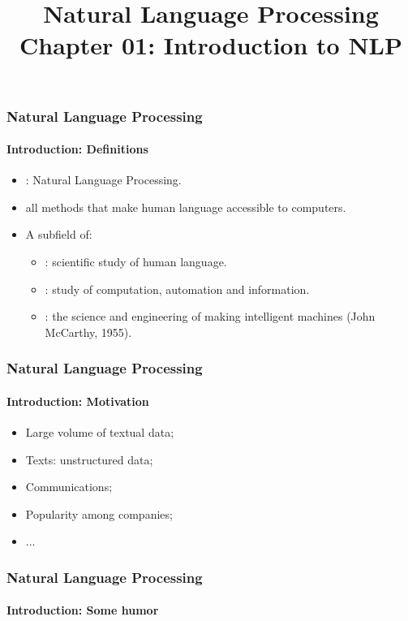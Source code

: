 \documentclass[xcolor=table]{beamer}
\title[NLP: 01- Introduction]%
{Natural Language Processing\\Chapter 01: Introduction to NLP}
\begin{document}
	
\begin{frame}
\frametitle{Natural Language Processing}
\framesubtitle{Introduction: Definitions}

\begin{itemize}
	\item {}: Natural Language Processing.
	\item all methods that make human language accessible to computers.
\end{itemize}
\begin{minipage}{0.78\textwidth}
\begin{itemize}
	\item A subfield of:
	\begin{itemize}
		\item {}: scientific study of human language.
		\item {}: study of computation, automation and information.
		\item {}: the science and engineering of
		making intelligent machines (John McCarthy, 1955).
	\end{itemize}
\end{itemize}
\end{minipage}
\begin{minipage}{0.20\textwidth}
\end{minipage}
\end{frame}

\begin{frame}
\frametitle{Natural Language Processing}
\framesubtitle{Introduction: Motivation}

\begin{itemize}
	\item Large volume of textual data;
	
	\item Texts: unstructured data;
	
	\item Communications;
	
	\item Popularity among companies;
	
	\item ...
\end{itemize}

\end{frame}

\begin{frame}
\frametitle{Natural Language Processing}
\framesubtitle{Introduction: Some humor}

\begin{center}
\end{center}

\end{frame}
\end{document}

